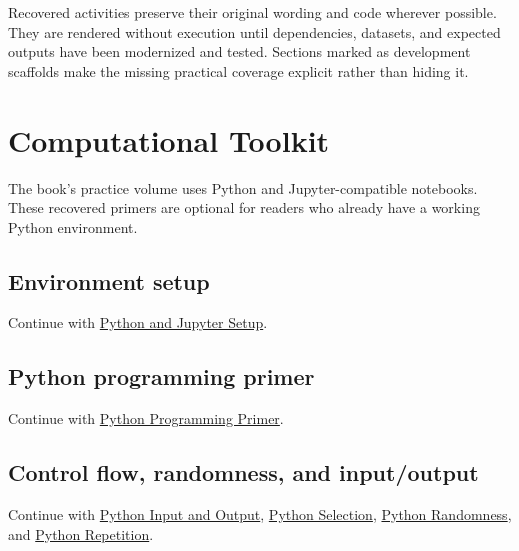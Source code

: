 \documentclass[
  letterpaper,
]{scrbook}
\begin{document}
Recovered activities preserve their original wording and code wherever
possible. They are rendered without execution until dependencies,
datasets, and expected outputs have been modernized and tested. Sections
marked as development scaffolds make the missing practical coverage
explicit rather than hiding it.

\chapter*{Computational Toolkit}\label{ch-practice-toolkit}


The book's practice volume uses Python and Jupyter-compatible notebooks.
These recovered primers are optional for readers who already have a
working Python environment.

\section*{Environment setup}\label{sec-pr-toolkit-setup}


Continue with \hyperref[sec-lab-setup]{Python and Jupyter Setup}.

\section*{Python programming primer}\label{sec-pr-toolkit-python}


Continue with \hyperref[sec-lab-python-intro]{Python Programming
Primer}.

\section*{Control flow, randomness, and
input/output}\label{sec-pr-toolkit-control-flow}


Continue with \hyperref[sec-lab-python-io]{Python Input and Output},
\hyperref[sec-lab-python-selection]{Python Selection},
\hyperref[sec-lab-python-random]{Python Randomness}, and
\hyperref[sec-lab-python-loops]{Python Repetition}.
\end{document}
